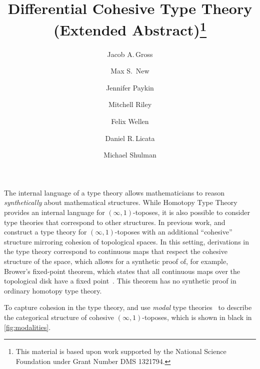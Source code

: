 \documentclass{article}
\title{Differential Cohesive Type Theory (Extended Abstract)\thanks{This
    material is based upon work supported by the National Science Foundation
    under Grant Number DMS 1321794.}}
\author{Jacob A.\,Gross}
\affil[1]{University of Pittsburgh}
\author[2]{Max S.\, New}
\affil[2]{Northeastern University}
\author[3]{Jennifer Paykin}
\affil[3]{University of Pennsylvania}
\author[4]{Mitchell Riley}
\affil[4]{Wesleyan University}
\author[5]{Felix Wellen}
\affil[5]{Karlsruhe Institute of Technology}
\author[4]{Daniel R.\,Licata}
\author[6]{Michael Shulman}
\affil[6]{University of San Diego}
\date{}
\begin{document}
\maketitle


The internal language of a type theory allows mathematicians to reason
\emph{synthetically} about mathematical structures. While Homotopy Type Theory
provides an internal language for $(\infty,1)$-toposes, it is also possible to
consider type theories that correspond to other structures. In previous work,
\citet{Shulman2015} and \citet{Licata2016} construct a type theory for
$(\infty,1)$-toposes with an additional ``cohesive'' structure mirroring cohesion of
topological spaces. In this setting, derivations in the type theory correspond
to continuous maps that respect the cohesive structure of the space, which
allows for a synthetic proof of, for example, Brower's fixed-point theorem,
which states that all continuous maps over the topological disk have a fixed
point~\citep{Shulman2015}. This theorem has no synthetic proof in ordinary
homotopy type theory.

To capture cohesion in the type theory, \citep{Shulman2015} and
\citep{Licata2016} use \emph{modal} type theories~
to describe the categorical structure of cohesive $(\infty,1)$-toposes, which is
shown in black in \cref{fig:modalities}. 
\end{document}
